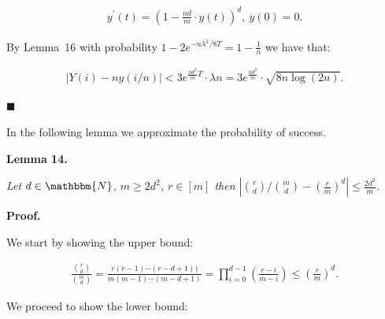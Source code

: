\[\begin{gathered}
\displaystyle y^{\prime}(t)=\left(1-\frac{nd}{m}\cdot y(t)\right)^{d},\ y(0)=0.
\end{gathered}\]


By Lemma 16 with probability $1-2e^{-n\lambda^{2}/8T}=1-\frac{1}{n}$ we have that:\par


\[\begin{gathered}
\displaystyle\bigl|Y(i)-ny(i/n)\bigr|<3e^{\frac{nd^{2}}{m}T}\cdot\lambda n=3e^{\frac{nd^{2}}{m}}\cdot\sqrt{8n\log(2n)}.
\end{gathered}\]


\ensuremath{\blacksquare}\par





In the following lemma we approximate the probability of success.\par





\par\medskip\noindent\textbf{\textbf{Lemma 14}\textbf{.}}\par



\emph{Let $d\in\mathbbm{N}$, $m\geq 2d^{2}$, $r\in[m]$
then $|\binom{r}{d}/\binom{m}{d}-\left(\frac{r}{m}\right)^{d}|\leq\frac{2d^{2}}{m}$.}\par






\par\medskip\noindent\textbf{Proof.}\par



We start by showing the upper bound:\par


\[\begin{gathered}
\displaystyle\frac{\binom{r}{d}}{\binom{m}{d}}=\frac{r(r-1)\cdots(r-d+1))}{m(m-1)\cdots(m-d+1)}=\prod_{i=0}^{d-1}\left(\frac{r-i}{m-i}\right)\leq\left(\frac{r}{m}\right)^{d}.
\end{gathered}\]


We proceed to show the lower bound:\par


